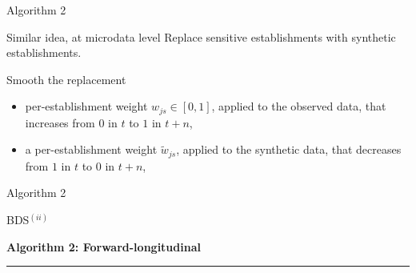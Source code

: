 \begin{frame}{Algorithm 2}
\begin{block}{Similar idea, at microdata level}
Replace sensitive establishments with synthetic establishments.
\end{block}
\begin{block}{Smooth the replacement}
\begin{itemize}

\item per-establishment weight $w_{js} \in [0,1]$, applied to the observed data, that increases from 
$0$ in $t$ to $1$ in $t+n$, 
\item a per-establishment weight $\tilde{w}_{js}$, applied to the synthetic data, that decreases 
from $1$ in $t$ to $0$ in 
$t+n$, 
	
\end{itemize}
\end{block}
\end{frame}


\begin{frame}[fragile]{Algorithm 2}
	

	\begin{block}{BDS$^{(ii)}$}
\begin{algorithm}
{\bf Algorithm 2: Forward-longitudinal}
\hrule
\label{algorithm:2}
\begin{algorithmic}
\EndIf
{}

\end{algorithmic}
\end{algorithm}

	\end{block}
\end{frame}


